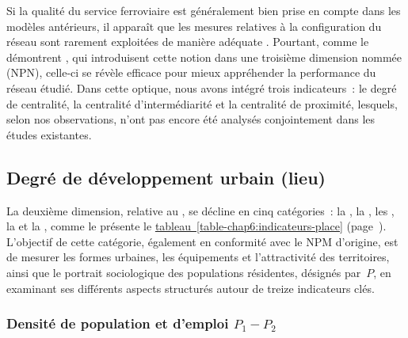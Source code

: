 \begin{refsegment}
Si la qualité du service ferroviaire est généralement bien prise en compte dans les modèles antérieurs, il apparaît que les mesures relatives à la configuration du réseau sont rarement exploitées de manière adéquate \textcolor{blue}{\autocite[72-74]{papa_accessibility_2015}}. Pourtant, comme le démontrent \textcolor{blue}{\textcite[8]{dou_integrating_2021}}, qui introduisent cette notion dans une troisième dimension nommée  (NPN), celle-ci se révèle efficace pour mieux appréhender la performance du réseau étudié. Dans cette optique, nous avons intégré trois indicateurs~: le degré de centralité, la centralité d'intermédiarité et la centralité de proximité, lesquels, selon nos observations, n'ont pas encore été analysés conjointement dans les études existantes.%

\subsection{Degré de développement urbain (lieu)
    \label{chap6:methodologie-indicateurs-place}
    }

La deuxième dimension, relative au , se décline en cinq catégories~: la , la , les , la  et la , comme le présente le \hyperref[table-chap6:indicateurs-place]{tableau~\ref{table-chap6:indicateurs-place}} (page~\pageref{table-chap6:indicateurs-place}). L'objectif de cette catégorie, également en conformité avec le \acrshort{NPM} d'origine, est de mesurer les formes urbaines, les équipements et l'attractivité des territoires, ainsi que le portrait sociologique des populations résidentes, désignés par~\(P\), en examinant ses différents aspects structurés autour de treize indicateurs clés.%


\subsubsection*{Densité de population et d'emploi \(P_{1} - P_{2}\)
    \label{chap6:indicateurs-place-densite}
    }


\end{refsegment}
